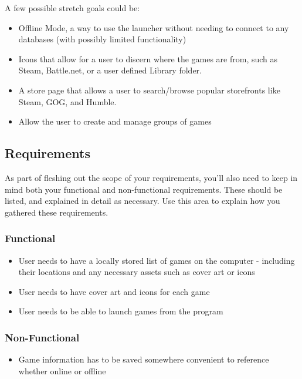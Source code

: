 \documentclass[10pt,conference,onecolumn,compsoc]{IEEEtran}
\begin{document}
A few possible stretch goals could be:

\begin{itemize}
\item Offline Mode, a way to use the launcher without needing to connect to any databases (with possibly limited functionality)
\item Icons that allow for a user to discern where the games are from, such as Steam, Battle.net, or a user defined Library folder.
\item A store page that allows a user to search/browse popular storefronts like Steam, GOG, and Humble.
\item Allow the user to create and manage groups of games
\end{itemize}

\subsection{Requirements}
As part of fleshing out the scope of your requirements, you'll also need to keep in mind both your functional and non-functional requirements.  These should be listed, and explained in detail as necessary.  Use this area to explain how you gathered these requirements.

\subsubsection{Functional}

\begin{itemize}
\item User needs to have a locally stored list of games on the computer - including their locations and any necessary assets such as cover art or icons
\item User needs to have cover art and icons for each game
\item User needs to be able to launch games from the program
\end{itemize}

\subsubsection{Non-Functional}

\begin{itemize}
\item Game information has to be saved somewhere convenient to reference whether online or offline 
\end{itemize}
\end{document}

